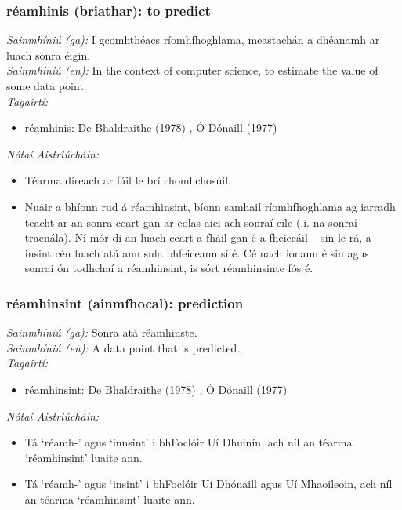 \subsubsection*{réamhinis (briathar): to predict}
 \noindent \textit{Sainmhíniú (ga):} I gcomhthéacs ríomhfhoghlama, meastachán a dhéanamh ar luach sonra éigin.
\\
 \noindent \textit{Sainmhíniú (en):} In the context of computer science, to estimate the value of some data point.
\\
 \noindent \textit{Tagairtí:}
\begin{itemize}
	\item réamhinis: De Bhaldraithe (1978) \cite{de-bhaldraithe}, Ó Dónaill (1977) \cite{odonaill}
\end{itemize}

 \noindent \textit{Nótaí Aistriúcháin:}
\begin{itemize}
	\item Téarma díreach ar fáil le brí chomhchosúil.
	\item Nuair a bhíonn rud á réamhinsint, bíonn samhail ríomhfhoghlama ag iarradh teacht ar an sonra ceart gan ar eolas aici ach sonraí eile (.i. na sonraí traenála). Ní mór di an luach ceart a fháil gan é a fheiceáil -- sin le rá, a insint cén luach atá ann sula bhfeiceann sí é. Cé nach ionann é sin agus sonraí ón todhchaí a réamhinsint, is sórt réamhinsinte fós é.
\end{itemize}


\subsubsection*{réamhinsint (ainmfhocal): prediction}
 \noindent \textit{Sainmhíniú (ga):} Sonra atá réamhinste.
\\
 \noindent \textit{Sainmhíniú (en):} A data point that is predicted.
\\
 \noindent \textit{Tagairtí:}
\begin{itemize}
	\item réamhinsint: De Bhaldraithe (1978) \cite{de-bhaldraithe}, Ó Dónaill (1977) \cite{odonaill}
\end{itemize}

 \noindent \textit{Nótaí Aistriúcháin:}
\begin{itemize}
	\item Tá `réamh-' agus `innsint' i bhFoclóir Uí Dhuinín, ach níl an téarma `réamhinsint' luaite ann.
	\item Tá `réamh-' agus `insint' i bhFoclóir Uí Dhónaill agus Uí Mhaoileoin, ach níl an téarma `réamhinsint' luaite ann.
\end{itemize}


